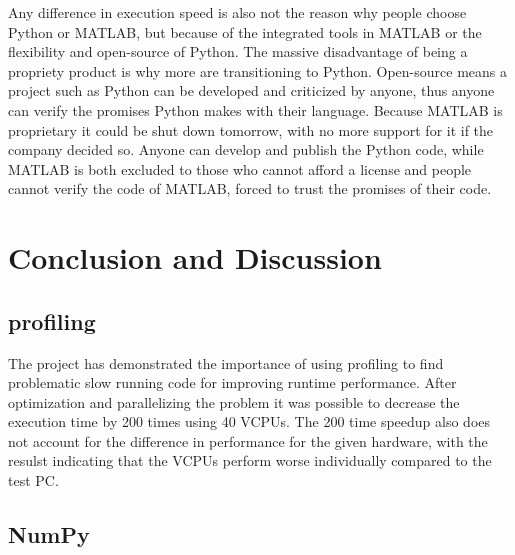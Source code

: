 \documentclass[12pt, a4paper]{article}
\begin{document}
Any difference in execution speed is also not the reason why people choose Python or MATLAB, but because of the integrated tools in MATLAB or the flexibility and open-source of Python.
The massive disadvantage of being a propriety product is why more are transitioning to Python.
Open-source means a project such as Python can be developed and criticized by anyone, thus anyone can verify the promises Python makes with their language.
Because MATLAB is proprietary it could be shut down tomorrow, with no more support for it if the company decided so.
Anyone can develop and publish the Python code, while MATLAB is both excluded to those who cannot afford a license and people cannot verify the code of MATLAB, forced to trust the promises of their code.



\section{Conclusion and Discussion}

\subsection{profiling}

The project has demonstrated the importance of using profiling to find problematic slow running code for improving runtime performance.
After optimization and parallelizing the problem it was possible to decrease the execution time by 200 times using 40 VCPUs. 
The 200 time speedup also does not account for the difference in performance for the given hardware, with the resulst indicating that the VCPUs perform worse individually compared to the test PC.

\subsection{NumPy}
\end{document}
